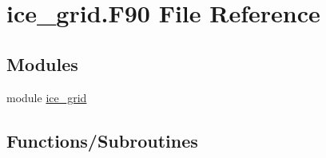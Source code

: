 \hypertarget{ice__grid_8F90}{
\section{ice\_\-grid.F90 File Reference}
\label{ice__grid_8F90}
}
\subsection*{Modules}
\begin{DoxyCompactItemize}
\item 
module \hyperlink{namespaceice__grid}{ice\_\-grid}
\end{DoxyCompactItemize}
\subsection*{Functions/Subroutines}
